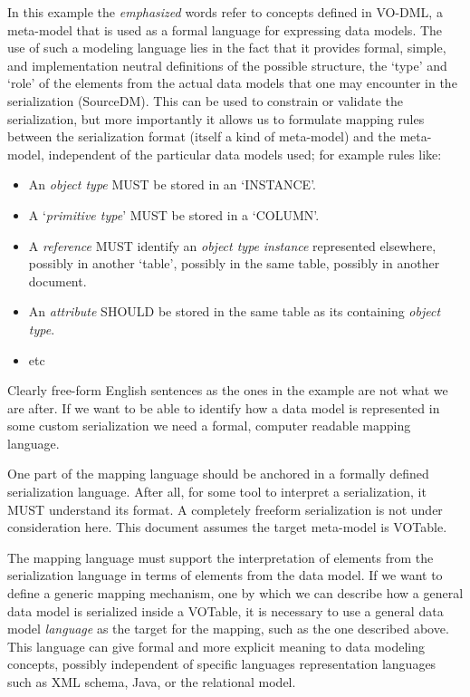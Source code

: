 \documentclass[11pt,a4paper]{ivoa}
\begin{document}
In this example the \emph{emphasized} words refer to concepts defined in
VO-DML, a meta-model that is used as a formal language for expressing
data models. The use of such a modeling language lies in the fact that
it provides formal, simple, and implementation neutral definitions of
the possible structure, the `type' and `role' of the elements from the
actual data models that one may encounter in the serialization
(SourceDM). This can be used to constrain or validate the serialization,
but more importantly it allows us to formulate mapping rules between the
serialization format (itself a kind of meta-model) and the meta-model,
independent of the particular data models used; for example rules like:

\begin{itemize}
\item
  An \emph{object type} MUST be stored in an `INSTANCE'.
\item
  A `\emph{primitive type}' MUST be stored in a `COLUMN'.
\item
  A \emph{reference} MUST identify an \emph{object type} \emph{instance}
  represented elsewhere, possibly in another `table', possibly in the
  same table, possibly in another document.
\item
  An \emph{attribute} SHOULD be stored in the same table as its
  containing \emph{object type}.
\item
  etc
\end{itemize}

Clearly free-form English sentences as the ones in the example are not
what we are after. If we want to be able to identify how a data model is
represented in some custom serialization we need a formal, computer
readable mapping language.

One part of the mapping language should be anchored in a formally
defined serialization language. After all, for some tool to interpret a
serialization, it MUST understand its format. A completely freeform
serialization is not under consideration here. This document assumes the
target meta-model is VOTable.

The mapping language must support the interpretation of elements from
the serialization language in terms of elements from the data model. If
we want to define a generic mapping mechanism, one by which we can
describe how a general data model is serialized inside a VOTable, it is
necessary to use a general data model \emph{language} as the target for
the mapping, such as the one described above. This language can give
formal and more explicit meaning to data modeling concepts, possibly
independent of specific languages representation languages such as XML
schema, Java, or the relational model.
\end{document}
